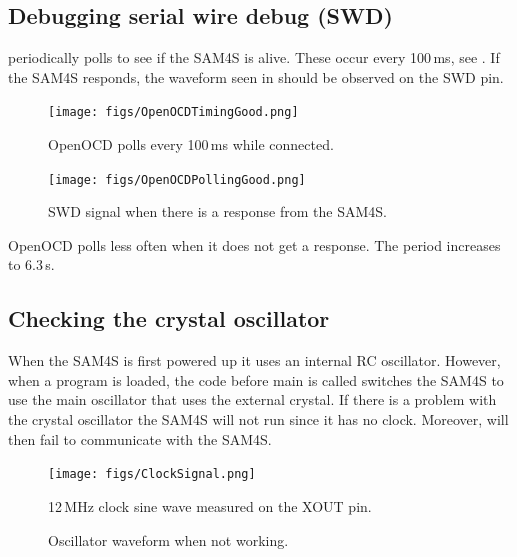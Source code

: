 \subsection{Debugging serial wire debug (SWD)}
\label{debugging-serial-wire-debug-swd}

 periodically polls to see if the SAM4S is alive.
These occur every 100\,ms, see .  If the SAM4S
responds, the waveform seen in  should be
observed on the SWD pin.

\begin{figure}[!h]
\centering
\texttt{[image: figs/OpenOCDTimingGood.png]}
\caption{OpenOCD polls every 100\,ms while connected.}
\label{fig:openocd-poll}
\end{figure}

\begin{figure}[!h]
\centering
\texttt{[image: figs/OpenOCDPollingGood.png]}
\caption{SWD signal when there is a response from the SAM4S.}
\label{fig:openocd-response}
\end{figure}



OpenOCD polls less often when it does not get a response. The period
increases to 6.3\,s.

\subsection{Checking the crystal oscillator}
\label{checking-the-crystal-oscillator}

When the SAM4S is first powered up it uses an internal RC oscillator.
However, when a program is loaded, the code before main is called
switches the SAM4S to use the main oscillator that uses the external
crystal.  If there is a problem with the crystal oscillator the SAM4S
will not run since it has no clock.  Moreover,  will
then fail to communicate with the SAM4S.

\begin{figure}[!h]
\centering
\texttt{[image: figs/ClockSignal.png]}
\caption{12\,MHz clock sine wave measured on the XOUT pin.}
\label{fig:xout}
\end{figure}

\begin{figure}[!h]
  \centering
  \caption{Oscillator waveform when not working.}
\end{figure}

